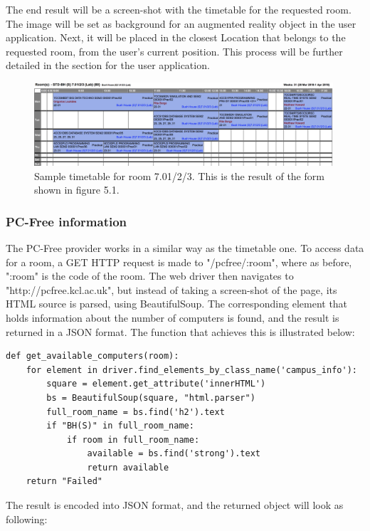 The end result will be a screen-shot with the timetable for the requested room. The image will be set as background for an augmented reality object in the user application. Next, it will be placed in the closest Location that belongs to the requested room, from the user's current position. This process will be further detailed in the section for the user application.

\begin{figure}[H]
    \centering
    \includegraphics[width=420px, height=117px]{Implementation&Testing/timetable-701.png}
    \centering
    \caption{Sample timetable for room 7.01/2/3. This is the result of the form shown in figure 5.1.}
\end{figure}

\subsubsection*{PC-Free information}
The PC-Free provider works in a similar way as the timetable one. To access data for a room, a GET HTTP request is made to "/pcfree/:room", where as before, ":room" is the code of the room. The web driver then navigates to "http://pcfree.kcl.ac.uk", but instead of taking a screen-shot of the page, its HTML source is parsed, using BeautifulSoup. The corresponding element that holds information about the number of computers is found, and the result is returned in a JSON format. The function that achieves this is illustrated below:

\begin{lstlisting}
def get_available_computers(room):
    for element in driver.find_elements_by_class_name('campus_info'):
        square = element.get_attribute('innerHTML')
        bs = BeautifulSoup(square, "html.parser")
        full_room_name = bs.find('h2').text
        if "BH(S)" in full_room_name:
            if room in full_room_name:
                available = bs.find('strong').text
                return available
    return "Failed"
\end{lstlisting}

The result is encoded into JSON format, and the returned object will look as following:

